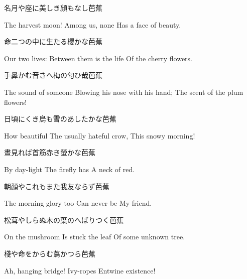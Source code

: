 \begin{haiku}
    {\FH 名月や座に美しき顔もなし}\hfill{\FH 芭蕉}

    \vin{} The harvest moon!
    \vin{} \vin{} Among us, none
    \vin{} \vin{} \vin{} Has a face of beauty.
\end{haiku}

\begin{haiku}
    {\FH 命二つの中に生たる櫻かな}\hfill{\FH 芭蕉}

    \vin{} Our two lives:
    \vin{} \vin{} Between them is the life
    \vin{} \vin{} \vin{} Of the cherry flowers.
\end{haiku}

\begin{haiku}
    {\FH 手鼻かむ音さへ梅の匂ひ哉}\hfill{\FH 芭蕉}

    \vin{} The sound of someone
    \vin{} \vin{} Blowing his nose with his hand;
    \vin{} \vin{} \vin{} The scent of the plum flowers!
\end{haiku}

\begin{haiku}
    {\FH 日頃にくき烏も雪のあしたかな}\hfill{\FH 芭蕉}

    \vin{} How beautiful
    \vin{} \vin{} The usually hateful crow,
    \vin{} \vin{} \vin{} This snowy morning!
\end{haiku}

\begin{haiku}
    {\FH 晝見れば首筋赤き螢かな}\hfill{\FH 芭蕉}

    \vin{} By day-light
    \vin{} \vin{} The firefly has
    \vin{} \vin{} \vin{} A neck of red.
\end{haiku}

\begin{haiku}
    {\FH 朝顔やこれもまた我友ならず}\hfill{\FH 芭蕉}

    \vin{} The morning glory too
    \vin{} \vin{} Can never be
    \vin{} \vin{} \vin{} My friend.
\end{haiku}

\begin{haiku}
    {\FH 松茸やしらぬ木の葉のへばりつく}\hfill{\FH 芭蕉}

    \vin{} On the mushroom
    \vin{} \vin{} Is stuck the leaf
    \vin{} \vin{} \vin{} Of some unknown tree.
\end{haiku}

\begin{haiku}
    {\FH 棧や命をからむ蔦かつら}\hfill{\FH 芭蕉}

    \vin{} Ah, hanging bridge!
    \vin{} \vin{} Ivy-ropes
    \vin{} \vin{} \vin{} Entwine existence!
\end{haiku}

